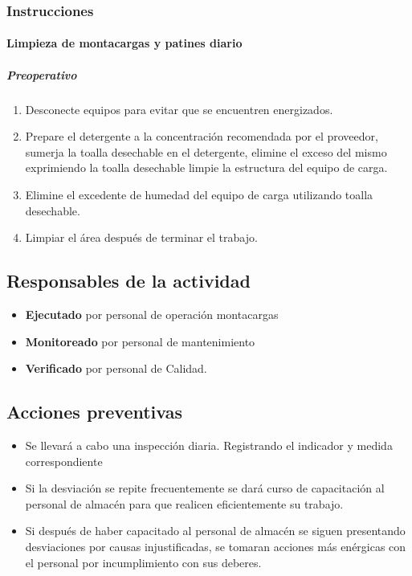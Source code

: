 \subsubsection{Instrucciones}

\paragraph{Limpieza de montacargas y patines diario}

\subparagraph{Preoperativo}

\begin{enumerate}
	\item Desconecte equipos para evitar que se encuentren energizados.
	\item Prepare el detergente a la concentración recomendada por el proveedor, sumerja la toalla desechable en el detergente, elimine el exceso del mismo exprimiendo la toalla desechable limpie la estructura del equipo de carga.
	\item Elimine el excedente de humedad del equipo de carga utilizando toalla desechable.
	\item Limpiar el área después de terminar el trabajo.
\end{enumerate}

\subsection{Responsables de la actividad}

\begin{itemize}
	\item \textbf{Ejecutado} por personal de operación montacargas
	\item \textbf{Monitoreado} por personal de mantenimiento
	\item \textbf{Verificado} por personal de Calidad.
\end{itemize}

\subsection{Acciones preventivas}

\begin{itemize}
	\item Se llevará a cabo una inspección diaria. Registrando el indicador y medida correspondiente
	\item Si la desviación se repite frecuentemente se dará curso de capacitación al personal de almacén para que realicen eficientemente su trabajo.
	\item Si después de haber capacitado al personal de almacén se siguen presentando desviaciones por causas injustificadas, se tomaran acciones más enérgicas con el personal por incumplimiento con sus deberes.
\end{itemize}

